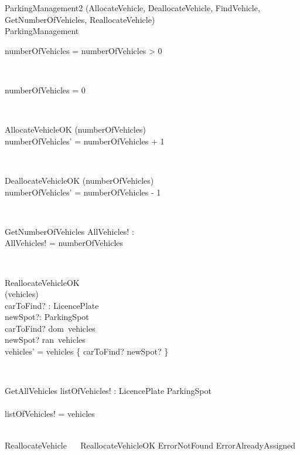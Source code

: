 \documentclass[12pt]{article}
\begin{document}
\begin{spacing}{1.5}
\begin{class}{ParkingManagement2}
\upharpoonright (AllocateVehicle, DeallocateVehicle, FindVehicle, GetNumberOfVehicles, ReallocateVehicle)\\
ParkingManagement\\
\begin{state}
numberOfVehicles = 
\where
numberOfVehicles > 0
\end{state} \\
\begin{init}
numberOfVehicles = 0 \\
\end{init} \\
\begin{op}{AllocateVehicleOK}
\Delta (numberOfVehicles)\\
\ST
numberOfVehicles' = numberOfVehicles + 1\\
\end{op}\\
\begin{op}{DeallocateVehicleOK}
\Delta (numberOfVehicles)\\
\ST
numberOfVehicles' = numberOfVehicles - 1\\
\end{op}\\
\begin{op}{GetNumberOfVehicles }
AllVehicles! : \\
\ST
AllVehicles! = numberOfVehicles\\
\end{op}\\
\begin{op}{ReallocateVehicleOK}
\\
\Delta (vehicles)\\
carToFind? : LicencePlate\\
newSpot?: ParkingSpot\\
\ST
carToFind? \in dom~vehicles\\
newSpot? \notin ran~vehicles\\
vehicles' = vehicles \oplus \{ carToFind? \rightarrowtail newSpot? \}
\\
\end{op}\\
\begin{op}{GetAllVehicles}
listOfVehicles! : LicencePlate  \rightarrowtail ParkingSpot\\\\
\ST
listOfVehicles! = vehicles\\
\end{op}\\
ReallocateVehicle \ \mathrel{\widehat{=}} \ ReallocateVehicleOK \vee ErrorNotFound \vee ErrorAlreadyAssigned\\
\end{class}

\end{spacing}
\end{document}
